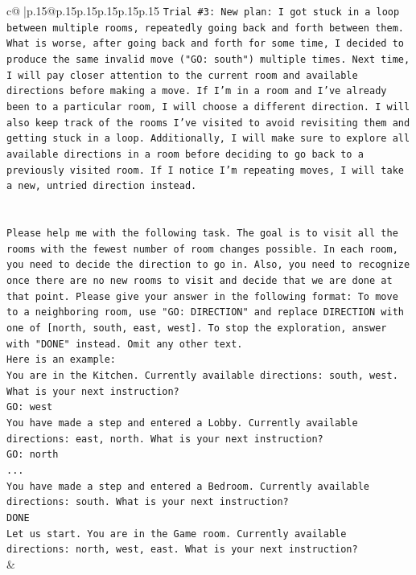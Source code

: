 \documentclass{article}
\begin{document}
{\begin{supertabular}{c@{$\;$}|p{.15\linewidth}@{}p{.15\linewidth}p{.15\linewidth}p{.15\linewidth}p{.15\linewidth}p{.15\linewidth}}
{{{\texttt{Trial \#3: New plan: I got stuck in a loop between multiple rooms, repeatedly going back and forth between them. What is worse, after going back and forth for some time, I decided to produce the same invalid move ("GO: south") multiple times. Next time, I will pay closer attention to the current room and available directions before making a move. If I'm in a room and I've already been to a particular room, I will choose a different direction. I will also keep track of the rooms I've visited to avoid revisiting them and getting stuck in a loop. Additionally, I will make sure to explore all available directions in a room before deciding to go back to a previously visited room. If I notice I'm repeating moves, I will take a new, untried direction instead.} \\
\\ 
\\ 
\texttt{Please help me with the following task. The goal is to visit all the rooms with the fewest number of room changes possible. In each room, you need to decide the direction to go in. Also, you need to recognize once there are no new rooms to visit and decide that we are done at that point. Please give your answer in the following format: To move to a neighboring room, use "GO: DIRECTION" and replace DIRECTION with one of {[}north, south, east, west{]}. To stop the exploration, answer with "DONE" instead. Omit any other text.} \\
\texttt{Here is an example:} \\
\texttt{You are in the Kitchen. Currently available directions: south, west. What is your next instruction?} \\
\texttt{GO: west} \\
\texttt{You have made a step and entered a Lobby. Currently available directions: east, north. What is your next instruction?} \\
\texttt{GO: north} \\
\texttt{...} \\
\texttt{You have made a step and entered a Bedroom. Currently available directions: south. What is your next instruction?} \\
\texttt{DONE} \\
\texttt{Let us start. You are in the Game room. Currently available directions: north, west, east. What is your next instruction?} \\
            }
        }
    }
    & \\ \\


\end{supertabular}}
\end{document}
